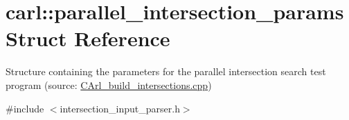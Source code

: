 \hypertarget{structcarl_1_1parallel__intersection__params}{}\section{carl\+:\+:parallel\+\_\+intersection\+\_\+params Struct Reference}
\label{structcarl_1_1parallel__intersection__params}


Structure containing the parameters for the parallel intersection search test program (source\+: \hyperlink{_c_arl__build__intersections_8cpp}{C\+Arl\+\_\+build\+\_\+intersections.\+cpp})  




{\ttfamily \#include $<$intersection\+\_\+input\+\_\+parser.\+h$>$}

